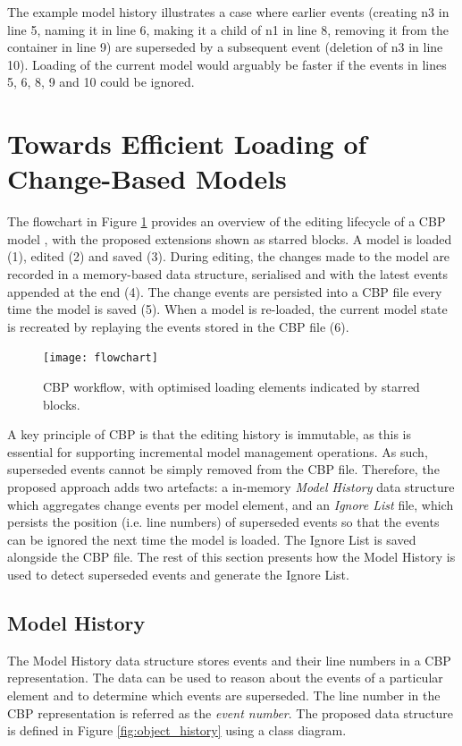The example model history illustrates a case where  earlier events (creating \textsf{n3} in line 5, naming it in line 6, making it a child of \textsf{n1} in line 8, removing it from the container in line 9) are superseded by a subsequent event (deletion of \textsf{n3} in line 10).  Loading of the current model would arguably be faster if the events in lines 5, 6, 8, 9 and 10 could be ignored.

\section{Towards Efficient Loading of Change-Based Models}
\label{sec:loading_time_optimisation}

The flowchart in Figure \ref{fig:flowchart} provides an overview of the editing lifecycle of a CBP model \cite{DBLP:conf/models/YohannisKP17}, with the proposed extensions shown as starred blocks. A model is loaded (1), edited (2) and saved (3).  During editing, the changes made to the model are recorded in a memory-based data structure, serialised and with the latest events appended at the end (4). The change events are persisted into a CBP file every time the model is saved (5). When a model is re-loaded, the current model state is recreated by replaying the events stored in the CBP file (6).

\begin{figure}[ht]
\centering
\texttt{[image: flowchart]}
\caption{CBP workflow, with optimised loading elements indicated by starred blocks.}
\label{fig:flowchart}
\end{figure}

A key principle of CBP is that the editing history is immutable, as this is essential for supporting incremental model management operations. As such, superseded events cannot be simply removed from the CBP file. Therefore, the proposed approach adds two artefacts: a in-memory \textit{Model History} data structure which aggregates change events per model element, and an \textit{Ignore List} file, which persists the position (i.e. line numbers) of superseded events so that the events can be ignored the next time the model is loaded. The Ignore List is saved alongside the CBP file. The rest of this section presents how the Model History is used to detect superseded events and generate the Ignore List.

\subsection{Model History}
\label{subsec:model_history}
The Model History data structure stores events and their line numbers in a CBP representation.  The data can be used to reason about the events of a particular element and to determine which events are superseded. The line number in the CBP representation is referred as the \textit{event number}. The proposed data structure is defined in Figure \ref{fig:object_history} using a class diagram.  

